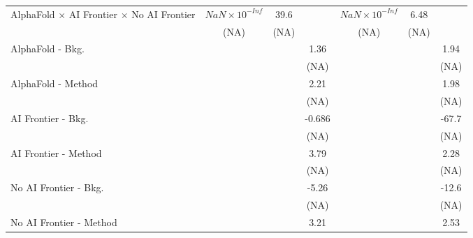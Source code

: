 \begin{tabular}{lcccccc}
   AlphaFold $\times$ AI Frontier $\times$ No AI Frontier                     & $NaN\times 10^{-Inf}$  & 39.6  &        & $NaN\times 10^{-Inf}$  & 6.48  &   \\   
                                                                              & (NA)                   & (NA)  &        & (NA)                   & (NA)  &   \\   
   AlphaFold - Bkg.                                                           &                        &       & 1.36   &                        &       & 1.94\\   
                                                                              &                        &       & (NA)   &                        &       & (NA)\\   
   AlphaFold - Method                                                         &                        &       & 2.21   &                        &       & 1.98\\   
                                                                              &                        &       & (NA)   &                        &       & (NA)\\   
   AI Frontier - Bkg.                                                         &                        &       & -0.686 &                        &       & -67.7\\   
                                                                              &                        &       & (NA)   &                        &       & (NA)\\   
   AI Frontier - Method                                                       &                        &       & 3.79   &                        &       & 2.28\\   
                                                                              &                        &       & (NA)   &                        &       & (NA)\\   
   No AI Frontier - Bkg.                                                      &                        &       & -5.26  &                        &       & -12.6\\   
                                                                              &                        &       & (NA)   &                        &       & (NA)\\   
   No AI Frontier - Method                                                    &                        &       & 3.21   &                        &       & 2.53\\   

\end{tabular}
